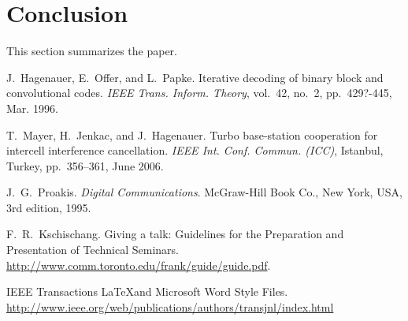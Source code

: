 \documentclass[journal, a4paper]{IEEEtran}
\begin{document}
\section{Conclusion}
    This section summarizes the paper.

\begin{thebibliography}{5}

    J.~Hagenauer, E.~Offer, and L.~Papke. Iterative decoding of binary block
    and convolutional codes. {\em IEEE Trans. Inform. Theory},
    vol.~42, no.~2, pp.~429?-445, Mar. 1996.

    T.~Mayer, H.~Jenkac, and J.~Hagenauer. Turbo base-station cooperation for intercell interference cancellation. {\em IEEE Int. Conf. Commun. (ICC)}, Istanbul, Turkey, pp.~356--361, June 2006.

    J.~G.~Proakis. {\em Digital Communications}. McGraw-Hill Book Co.,
    New York, USA, 3rd edition, 1995.

    F.~R.~Kschischang. Giving a talk: Guidelines for the Preparation and Presentation of Technical Seminars.
    \url{http://www.comm.toronto.edu/frank/guide/guide.pdf}.

    IEEE Transactions \LaTeX and Microsoft Word Style Files.
    \url{http://www.ieee.org/web/publications/authors/transjnl/index.html}

\end{thebibliography}

\end{document}
